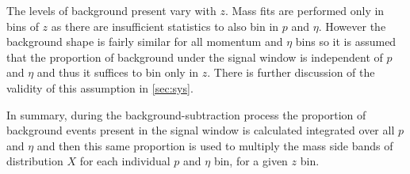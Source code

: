 The levels of background present vary with $z$. Mass fits are performed only in bins of $z$ as there are insufficient statistics to also bin in $p$ and $\eta$. However the background shape is fairly similar for all momentum and $\eta$ bins so it is assumed that the proportion of background under the signal window is independent of $p$ and $\eta$ and thus it suffices to bin only in $z$. There is further discussion of the validity of this assumption in \autoref{sec:sys}.

In summary, during the background-subtraction process the proportion of background events present in the signal window is calculated integrated over all $p$ and $\eta$ and then this same proportion is used to multiply the mass side bands of distribution $X$ for each individual $p$ and $\eta$ bin, for a given $z$ bin.

 


